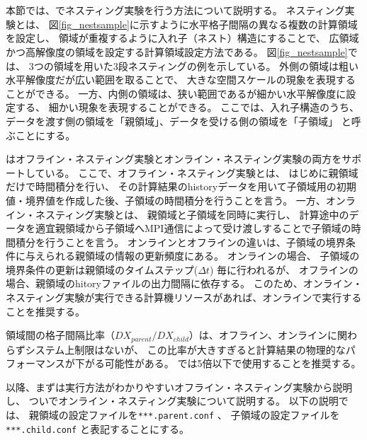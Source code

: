 \section{\SecAdvanceNesting} \label{sec:nest_exp}

本節では、\scalerm でネスティング実験を行う方法について説明する。
ネスティング実験とは、
図\ref{fig_nestsample}に示すように水平格子間隔の異なる複数の計算領域を設定し、
領域が重複するように入れ子（ネスト）構造にすることで、
広領域かつ高解像度の領域を設定する計算領域設定方法である。
図\ref{fig_nestsample}では、
3つの領域を用いた3段ネスティングの例を示している。
外側の領域は粗い水平解像度だが広い範囲を取ることで、
大きな空間スケールの現象を表現することができる。
一方、内側の領域は、狭い範囲であるが細かい水平解像度に設定する、
細かい現象を表現することができる。
ここでは、入れ子構造のうち、
データを渡す側の領域を「親領域」、データを受ける側の領域を「子領域」
と呼ぶことにする。

\scalerm はオフライン・ネスティング実験とオンライン・ネスティング実験の両方をサポートしている。
ここで、オフライン・ネスティング実験とは、
はじめに親領域だけで時間積分を行い、
その計算結果のhistoryデータを用いて子領域用の初期値・境界値を作成した後、子領域の時間積分を行うことを言う。
一方、オンライン・ネスティング実験とは、
親領域と子領域を同時に実行し、
計算途中のデータを適宜親領域から子領域へMPI通信によって受け渡しすることで子領域の時間積分を行うことを言う。
オンラインとオフラインの違いは、子領域の境界条件に与えられる親領域の情報の更新頻度にある。
オンラインの場合、
子領域の境界条件の更新は親領域のタイムステップ($\Delta t$) 毎に行われるが、
オフラインの場合、親領域のhitoryファイルの出力間隔に依存する。
このため、オンライン・ネスティング実験が実行できる計算機リソースがあれば、オンラインで実行することを推奨する。

領域間の格子間隔比率（$DX_{parent}/DX_{child}$）は、オフライン、オンラインに関わらずシステム上制限はないが、
この比率が大きすぎると計算結果の物理的なパフォーマンスが下がる可能性がある。
\scalerm では5倍以下で使用することを推奨する。

以降、まずは実行方法がわかりやすいオフライン・ネスティング実験から説明し、
ついでオンライン・ネスティング実験について説明する。
以下の説明では、
親領域の設定ファイルを\verb|***.parent.conf| 、
子領域の設定ファイルを\verb|***.child.conf| と表記することにする。

\\


